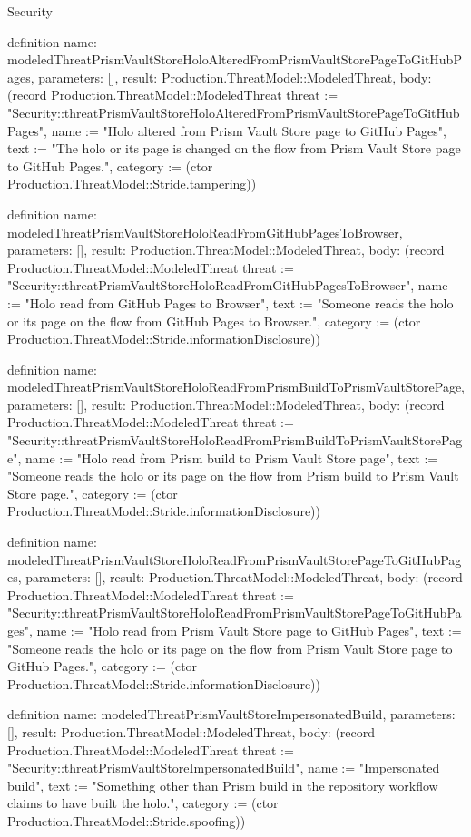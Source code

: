 \begin{lexlean}{Security}
\begin{semanticmodule}
definition{
  name: modeledThreatPrismVaultStoreHoloAlteredFromPrismVaultStorePageToGitHubPages,
  parameters: [],
  result: Production.ThreatModel::ModeledThreat,
  body: (record Production.ThreatModel::ModeledThreat {threat := "Security::threatPrismVaultStoreHoloAlteredFromPrismVaultStorePageToGitHubPages", name := "Holo altered from Prism Vault Store page to GitHub Pages", text := "The holo or its page is changed on the flow from Prism Vault Store page to GitHub Pages.", category := (ctor Production.ThreatModel::Stride.tampering)})
}

definition{
  name: modeledThreatPrismVaultStoreHoloReadFromGitHubPagesToBrowser,
  parameters: [],
  result: Production.ThreatModel::ModeledThreat,
  body: (record Production.ThreatModel::ModeledThreat {threat := "Security::threatPrismVaultStoreHoloReadFromGitHubPagesToBrowser", name := "Holo read from GitHub Pages to Browser", text := "Someone reads the holo or its page on the flow from GitHub Pages to Browser.", category := (ctor Production.ThreatModel::Stride.informationDisclosure)})
}

definition{
  name: modeledThreatPrismVaultStoreHoloReadFromPrismBuildToPrismVaultStorePage,
  parameters: [],
  result: Production.ThreatModel::ModeledThreat,
  body: (record Production.ThreatModel::ModeledThreat {threat := "Security::threatPrismVaultStoreHoloReadFromPrismBuildToPrismVaultStorePage", name := "Holo read from Prism build to Prism Vault Store page", text := "Someone reads the holo or its page on the flow from Prism build to Prism Vault Store page.", category := (ctor Production.ThreatModel::Stride.informationDisclosure)})
}

definition{
  name: modeledThreatPrismVaultStoreHoloReadFromPrismVaultStorePageToGitHubPages,
  parameters: [],
  result: Production.ThreatModel::ModeledThreat,
  body: (record Production.ThreatModel::ModeledThreat {threat := "Security::threatPrismVaultStoreHoloReadFromPrismVaultStorePageToGitHubPages", name := "Holo read from Prism Vault Store page to GitHub Pages", text := "Someone reads the holo or its page on the flow from Prism Vault Store page to GitHub Pages.", category := (ctor Production.ThreatModel::Stride.informationDisclosure)})
}

definition{
  name: modeledThreatPrismVaultStoreImpersonatedBuild,
  parameters: [],
  result: Production.ThreatModel::ModeledThreat,
  body: (record Production.ThreatModel::ModeledThreat {threat := "Security::threatPrismVaultStoreImpersonatedBuild", name := "Impersonated build", text := "Something other than Prism build in the repository workflow claims to have built the holo.", category := (ctor Production.ThreatModel::Stride.spoofing)})
}


\end{semanticmodule}
\end{lexlean}
